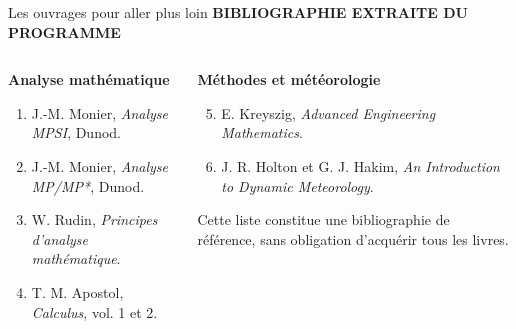 \documentclass[aspectratio=169,10pt]{beamer}
\newcommand{\meta}[1]{{\small\bfseries\color{turquoise} #1}\par\vspace{0.07cm}}
\begin{document}
\begin{frame}{Les ouvrages pour aller plus loin}
\meta{BIBLIOGRAPHIE EXTRAITE DU PROGRAMME}
\begin{columns}[T,onlytextwidth]
\begin{tcolorbox}[colback=pale,colframe=pale,height=4.08cm]
{\bfseries\color{bleu}Analyse mathématique}\par\vspace{0.20cm}
\small
\begin{enumerate}\setlength{\itemsep}{0.08cm}
\item J.-M. Monier, \emph{Analyse MPSI}, Dunod.
\item J.-M. Monier, \emph{Analyse MP/MP*}, Dunod.
\item W. Rudin, \emph{Principes d'analyse mathématique}.
\item T. M. Apostol, \emph{Calculus}, vol. 1 et 2.
\end{enumerate}
\end{tcolorbox}
\begin{tcolorbox}[colback=palevert,colframe=palevert,height=4.08cm]
{\bfseries\color{turquoise}Méthodes et météorologie}\par\vspace{0.20cm}
\small
\begin{enumerate}\setcounter{enumi}{4}\setlength{\itemsep}{0.15cm}
\item E. Kreyszig, \emph{Advanced Engineering Mathematics}.
\item J. R. Holton et G. J. Hakim, \emph{An Introduction to Dynamic Meteorology}.
\end{enumerate}
\vfill
{\scriptsize\color{gris}Cette liste constitue une bibliographie de référence, sans obligation d'acquérir tous les livres.}
\end{tcolorbox}
\end{columns}
\end{frame}
\end{document}
